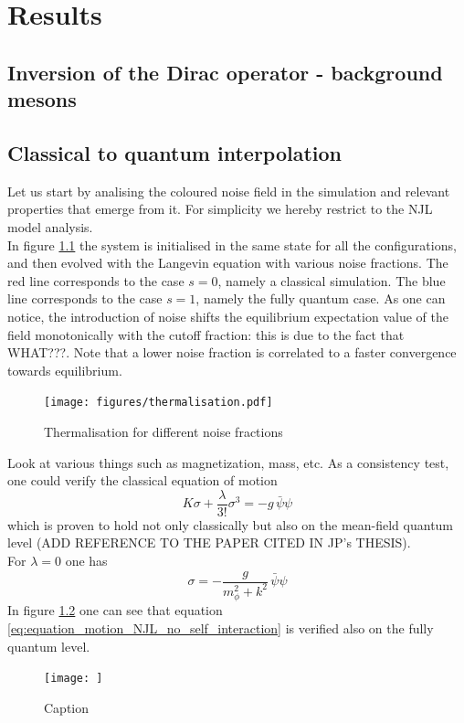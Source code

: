 \chapter{Results}

\section{Inversion of the Dirac operator - background mesons}

\section{Classical to quantum interpolation}

Let us start by analising the coloured noise field in the simulation and relevant properties that emerge from it. For simplicity we hereby restrict to the NJL model analysis. \\
In figure \ref{fig:thermalisation_different_noise_fracs} the system is initialised in the same state for all the configurations, and then evolved with the Langevin equation with various noise fractions. The red line corresponds to the case $s=0$, namely a classical simulation. The blue line corresponds to the case $s=1$, namely the fully quantum case. As one can notice, the introduction of noise shifts the equilibrium expectation value of the field monotonically with the cutoff fraction: this is due to the fact that WHAT???. Note that a lower noise fraction is correlated to a faster convergence towards equilibrium.
\begin{figure}
    \centering
    \texttt{[image: figures/thermalisation.pdf]}
    \caption{Thermalisation for different noise fractions}
    \label{fig:thermalisation_different_noise_fracs}
\end{figure}
Look at various things such as magnetization, mass, etc.
As a consistency test, one could verify the classical equation of motion 
\begin{equation}
    K \sigma + \frac{\lambda}{3!} \sigma^3 = - g  \, \bar\psi \psi
    \label{eq:eq_motion_NJL}
\end{equation} 
which is proven to hold not only classically but also on the mean-field quantum level (ADD REFERENCE TO THE PAPER CITED IN JP's THESIS). \\
For $\lambda = 0$ one has
\begin{equation}
    \sigma = -\frac{g}{m_\phi^2 + k^2} \, \bar\psi \psi
    \label{eq:equation_motion_NJL_no_self_interaction}
\end{equation}
In figure \ref{fig:equation_motion_NJL} one can see that equation \eqref{eq:equation_motion_NJL_no_self_interaction} is verified also on the fully quantum level.
\begin{figure}
    \centering
    \texttt{[image: ]}
    \caption{Caption}
    \label{fig:equation_motion_NJL}
\end{figure}


